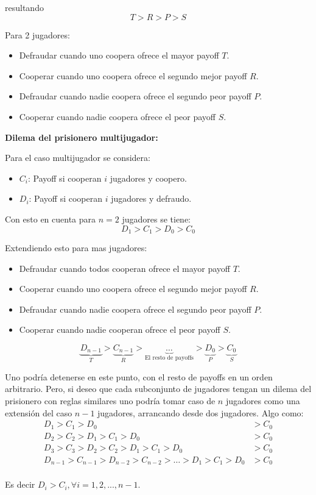 \documentclass[twocolumn,aps,prl]{revtex4-1}
\begin{document}
resultando
$$
T > R > P > S
$$

Para 2 jugadores:
\begin{itemize}
    \item Defraudar cuando uno coopera ofrece el mayor payoff $T$.
    \item Cooperar cuando uno coopera ofrece el segundo mejor payoff $R$.
    \item Defraudar cuando nadie coopera ofrece el segundo peor payoff $P$.
    \item Cooperar cuando nadie coopera ofrece el peor payoff $S$.
\end{itemize}

\textbf{Dilema del prisionero multijugador:}

Para el caso multijugador se considera:
\begin{itemize}
    \item $C_i$: Payoff si cooperan $i$ jugadores y coopero.
    \item $D_i$: Payoff si cooperan $i$ jugadores y defraudo.
\end{itemize}

Con esto en cuenta para $n=2$ jugadores se tiene:
$$
D_1 > C_1 > D_0 > C_0
$$

Extendiendo esto para mas jugadores:
\begin{itemize}
    \item Defraudar cuando todos cooperan ofrece el mayor payoff $T$.
    \item Cooperar cuando uno coopera ofrece el segundo mejor payoff $R$.
    \item Defraudar cuando nadie coopera ofrece el segundo peor payoff $P$.
    \item Cooperar cuando nadie cooperan ofrece el peor payoff $S$.
\end{itemize}
$$
  \underbrace{D_{n-1 }}_{T} 
> \underbrace{C_{n-1 }}_{R} 
> \underbrace{\ldots}_{\text{El resto de payoffs}} 
> \underbrace{D_{0 }}_{P}
> \underbrace{C_{0 }}_{S}
$$

Uno podría detenerse en este punto, con el resto de payoffs en un orden arbitrario. Pero, si deseo que cada subconjunto de jugadores tengan un dilema del prisionero con reglas similares uno podría tomar caso de $n$ jugadores como una extensión del caso $n-1$ jugadores, arrancando desde dos jugadores. Algo como:
$$
\begin{aligned}
  D_{1 }   > C_{1 }   > D_{0 }   &> C_{0 }    \\
  D_{2 }   > C_{2 }   > D_{1 }   > C_{1 }   > D_{0 } &> C_{0 }  \\
  D_{3 }   > C_{3 }   > D_{2 }   > C_{2 }   > D_{1 } > C_{1 } > D_{0 } &> C_{0 }  \\
  D_{n-1 } > C_{n-1 } > D_{n-2 } > C_{n-2 } > \ldots > D_{1 } > C_{1 } > D_{0 } &> C_{0 }\\
\end{aligned}
$$

Es decir $D_i > C_i, \forall i = 1, 2, ..., n-1$. 

% 
\end{document}

